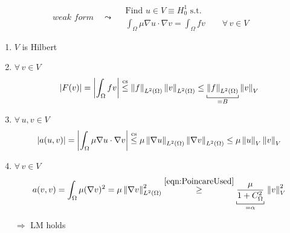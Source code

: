 \begin{equation*}
\textit{weak form}\quad \leadsto\quad
\boxed{
\begin{gathered}
\text{Find }u\in V\equiv H^1_0\text{ s.t.} \\
\int_\Omega \mu \nabla u\cdot\nabla v=\int_\Omega fv\qquad\forall \,v\in V
\end{gathered}}
\end{equation*}

\begin{enumerate}[label=\textit{(\roman*)}]
\item $V$ is Hilbert
\item $\forall\, v \in V$
\begin{equation*}
\abs{F(v)}=\abs{\int_\Omega fv}\overset{\text{cs}}{\leq} \norm{f}_{L^2(\Omega)} \norm{v}_{L^2(\Omega)} \leq \underbracket[0.5pt]{\norm{f}_{L^2(\Omega)}}_{=B} \norm{v}_{V} 
\end{equation*}
\item $\forall\, u,v \in V$
\begin{equation*}
\left\lvert a(u,v) \right\rvert=\left\lvert \int_\Omega \mu \nabla u\cdot \nabla v \right\rvert\overset{\text{cs}}{\leq}\mu \left\lVert \nabla u \right\rVert_{L^2(\Omega)} \left\lVert \nabla v \right\rVert_{L^2(\Omega)} \leq \mu \left\lVert u \right\rVert_{V} \left\lVert v \right\rVert_{V}
\end{equation*}
\item $\forall\, v \in V$
\begin{equation*}
a(v,v)=\int_\Omega\mu (\nabla v)^2=\mu\norm{\nabla v}^2_{L^2(\Omega)}\overset{\eqref{eqn:PoincareUsed}}{\geq} \underbracket[0.5pt]{\frac{\mu}{1+C_\Omega^2}}_{=\alpha}\,\norm{v}_V^2 
\end{equation*}
\item[$\Longrightarrow$] LM holds
\end{enumerate}

\smallskip

